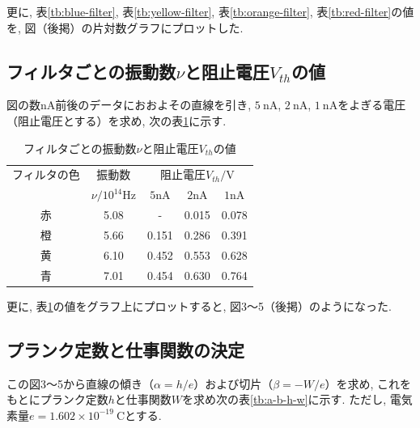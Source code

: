 \documentclass{jarticle}
\begin{document}
更に, 表\ref{tb:blue-filter}, 表\ref{tb:yellow-filter}, 表\ref{tb:orange-filter}, 表\ref{tb:red-filter}の値を, 図（後掲）の片対数グラフにプロットした.



\subsection{フィルタごとの振動数$\nu$と阻止電圧$V_{th}$の値}

図の数$\mathrm{nA}$前後のデータにおおよその直線を引き, $5\ \mathrm{nA}$, $2\ \mathrm{nA}$, $1\ \mathrm{nA}$をよぎる電圧（阻止電圧とする）を求め, 次の表\ref{tb:blocking-voltage}に示す.

\begin{table}[H]
  \centering
  \caption{フィルタごとの振動数$\nu$と阻止電圧$V_{th}$の値}
  \label{tb:blocking-voltage}
  \begin{tabular}{ccccc}
    \hline
    フィルタの色 & 振動数 & \multicolumn{3}{c}{阻止電圧$V_{th}/\mathrm{V}$} \\
    & $\nu/10^{14}\mathrm{Hz}$ & $5\mathrm{nA}$ & $2\mathrm{nA}$ & $1\mathrm{nA}$ \\
    \hline
    赤 & 5.08 & - & 0.015 & 0.078 \\
    橙 & 5.66 & 0.151 & 0.286 & 0.391 \\
    黄 & 6.10 & 0.452 & 0.553 & 0.628 \\
    青 & 7.01 & 0.454 & 0.630 & 0.764 \\
    \hline
  \end{tabular}
\end{table}

更に, 表\ref{tb:blocking-voltage}の値をグラフ上にプロットすると, 図3～5（後掲）のようになった.



\subsection{プランク定数と仕事関数の決定}

この図3～5から直線の傾き（$\alpha = h / e$）および切片（$\beta = -W / e$）を求め, これをもとにプランク定数$h$と仕事関数$W$を求め次の表\ref{tb:a-b-h-w}に示す.
ただし, 電気素量$e = 1.602\times 10^{-19}\ \mathrm{C}$\cite{電気素量}とする.
\end{document}
